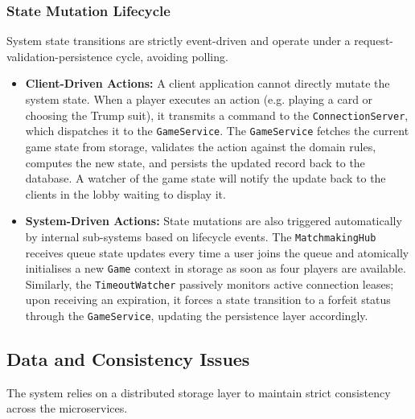 \documentclass{scrartcl}
\begin{document}
\subsubsection*{State Mutation Lifecycle}
System state transitions are strictly event-driven and operate under a request-validation-persistence cycle, avoiding polling.
\begin{itemize}
    \item \textbf{Client-Driven Actions:} A client application cannot directly mutate the system state. When a player executes an action (e.g. playing a card or choosing the Trump suit), it transmits a command to the \texttt{ConnectionServer}, which dispatches it to the \texttt{GameService}. The \texttt{GameService} fetches the current game state from storage, validates the action against the domain rules, computes the new state, and persists the updated record back to the database. A watcher of the game state will notify the update back to the clients in the lobby waiting to display it.
    \item \textbf{System-Driven Actions:} State mutations are also triggered automatically by internal sub-systems based on lifecycle events. The \texttt{MatchmakingHub} receives queue state updates every time a user joins the queue and atomically initialises a new \texttt{Game} context in storage as soon as four players are available. Similarly, the \texttt{TimeoutWatcher} passively monitors active connection leases; upon receiving an expiration, it forces a state transition to a forfeit status through the \texttt{GameService}, updating the persistence layer accordingly.
\end{itemize}

\subsection{Data and Consistency Issues}\label{data-and-consistency-issues}
The system relies on a distributed storage layer to maintain strict consistency across the microservices.
\end{document}
